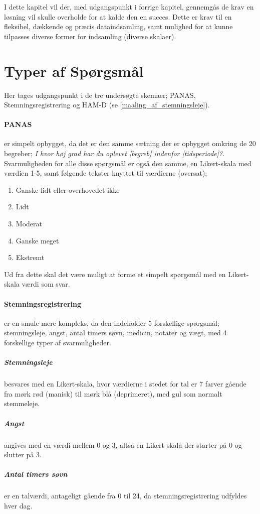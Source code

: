I dette kapitel vil der, med udgangspunkt i forrige kapitel, gennemgås de krav en løsning vil skulle overholde for at kalde den en succes.
Dette er krav til en fleksibel, dækkende og præcis dataindsamling, samt mulighed for at kunne tilpasses diverse former for indsamling (diverse skalaer).

\section{Typer af Spørgsmål}
Her tages udgangspunkt i de tre undersøgte skemaer; PANAS, Stemningsregistrering og HAM-D (se \cref{maaling_af_stemningsleje}).

\paragraph{PANAS} er simpelt opbygget, da det er den samme sætning der er opbygget omkring de 20 begreber; \textit{I hvor høj grad har du oplevet [begreb] indenfor [tidsperiode]?}.
Svarmuligheden for alle disse spørgsmål er også den samme, en Likert-skala med værdien 1-5, samt følgende tekster knyttet til værdierne (oversat);
\begin{enumerate}
\item Ganske lidt eller overhovedet ikke
\item Lidt
\item Moderat
\item Ganske meget
\item Ekstremt
\end{enumerate}

Ud fra dette skal det være muligt at forme et simpelt spørgsmål med en Likert-skala værdi som svar.

\paragraph{Stemningsregistrering} er en smule mere kompleks, da den indeholder 5 forskellige spørgsmål; stemningsleje, angst, antal timers søvn, medicin, notater og vægt, med 4 forskellige typer af svarmuligheder.

\subparagraph{Stemningsleje} besvares med en Likert-skala, hvor værdierne i stedet for tal er 7 farver gående fra mørk rød (manisk) til mørk blå (deprimeret), med gul som normalt stemmeleje.

\subparagraph{Angst} angives med en værdi mellem 0 og 3, altså en Likert-skala der starter på 0 og slutter på 3.

\subparagraph{Antal timers søvn} er en talværdi, antageligt gående fra 0 til 24, da stemningsregistrering udfyldes hver dag.

